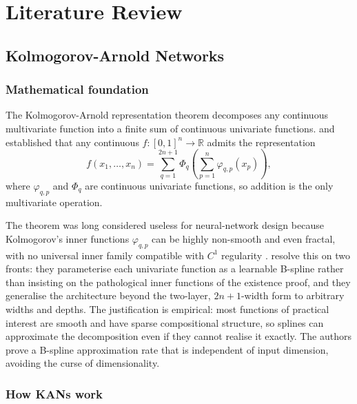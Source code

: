 \newpage
\section{Literature Review}\label{sec:literature}

\subsection{Kolmogorov-Arnold Networks}\label{subsec:lit_kan}

\subsubsection{Mathematical foundation}\label{subsubsec:kan_math}

The Kolmogorov-Arnold representation theorem decomposes any continuous multivariate function into a finite sum of continuous univariate functions. \citet{kolmogorov_1957} and \citet{arnold_1958} established that any continuous $f : [0,1]^n \to \mathbb{R}$ admits the representation
\begin{equation}
f(x_1, \ldots, x_n) = \sum_{q=1}^{2n+1} \Phi_q \! \left( \sum_{p=1}^{n} \varphi_{q,p}(x_p) \right),
\label{eq:kst}
\end{equation}
where $\varphi_{q,p}$ and $\Phi_q$ are continuous univariate functions, so addition is the only multivariate operation.

The theorem was long considered useless for neural-network design because Kolmogorov's inner functions $\varphi_{q,p}$ can be highly non-smooth and even fractal, with no universal inner family compatible with $C^1$ regularity \citep{liu_kan_2024}. \citet{liu_kan_2024} resolve this on two fronts: they parameterise each univariate function as a learnable B-spline rather than insisting on the pathological inner functions of the existence proof, and they generalise the architecture beyond the two-layer, $2n+1$-width form to arbitrary widths and depths. The justification is empirical: most functions of practical interest are smooth and have sparse compositional structure, so splines can approximate the decomposition even if they cannot realise it exactly. The authors prove a B-spline approximation rate that is independent of input dimension, avoiding the curse of dimensionality.


\subsubsection{How KANs work}\label{subsubsec:kan_arch}

